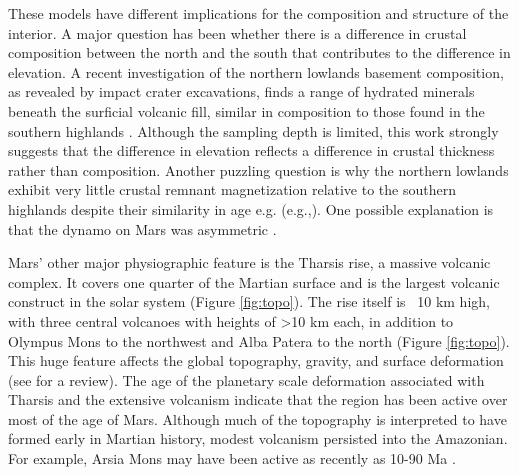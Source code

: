 These models have different implications for the composition and structure of the interior. A major question has been whether there is a difference in crustal composition between the north and the south that contributes to the difference in elevation.  A recent investigation of the northern lowlands basement composition, as revealed by impact crater excavations, finds a range of hydrated minerals beneath the surficial volcanic fill, similar in composition to those found in the southern highlands \citep{Pan2017}. Although the sampling depth is limited, this work strongly suggests that the difference in elevation reflects a difference in crustal thickness rather than composition.  Another puzzling question is why the northern lowlands exhibit very little crustal remnant magnetization relative to the southern highlands despite their similarity in age e.g. (e.g.,\cite{Langlais2004}).  One possible explanation is that the dynamo on Mars was asymmetric \cite{Stanley2008}.

Mars’ other major physiographic feature is the Tharsis rise, a massive volcanic complex.  It covers one quarter of the Martian surface and is the largest volcanic construct in the solar system (Figure \ref{fig:topo}).  The rise itself is ~10 km high, with three central volcanoes with heights of \textgreater 10 km each, in addition to Olympus Mons to the northwest and Alba Patera to the north (Figure \ref{fig:topo}).  This huge feature affects the global topography, gravity, and surface deformation  (see \citep{GolombekM.P.andPhillips2009PlanetaryTectonics}for a review). The age of the planetary scale deformation associated with Tharsis and the extensive volcanism indicate that the region has been active over most of the age of Mars. Although much of the topography is interpreted to have formed early in Martian history, modest volcanism persisted into the Amazonian.  For example, Arsia Mons may have been active as recently as 10-90 Ma \cite{Richardson2017}.  

